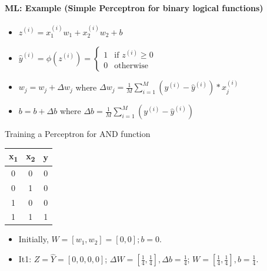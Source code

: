 \documentclass[xcolor=table]{beamer}
\subtitle[ML for NLP]{Chapter 02\\Machine learning for NLP}
\begin{document}
	

\begin{frame}
	\frametitle{\inserttitle}
	\framesubtitle{ML: Example (Simple Perceptron for binary logical functions)}
	
	\begin{minipage}{0.30\textwidth} 
	\end{minipage}
	\begin{minipage}{0.59\textwidth}
		\scriptsize
		\begin{itemize}
			\item $ z^{(i)} = x_1^{(i)} w_1 + x_2^{(i)} w_2 + b $
			\item $ \hat{y}^{(i)} = \phi(z^{(i)}) = \begin{cases}
				1 & \text{if } z^{(i)} \ge 0 \\
				0 & \text{otherwise}
			\end{cases} $
			\item $ w_j = w_j + \Delta w_j$ where $ \Delta w_j = \frac{1}{M}\sum_{i=1}^{M} (y^{(i)} - \hat{y}^{(i)}) * x_j^{(i)} $
			\item $ b = b + \Delta b$ where $ \Delta b = \frac{1}{M}\sum_{i=1}^{M} (y^{(i)} - \hat{y}^{(i)})$
		\end{itemize}
	\end{minipage}
	
	\vfill
	
	\begin{exampleblock}{Training a Perceptron for AND function}
		\begin{minipage}{0.2\textwidth} 
			\scriptsize
			\begin{tabular}{|c|c|c|}
				\hline
				x\textsubscript{1} & x\textsubscript{2} & y \\
				\hline
				0 & 0 & 0  \\
				\hline
				0 & 1 & 0 \\
				\hline
				1 & 0 & 0 \\
				\hline
				1 & 1 & 1 \\
				\hline
			\end{tabular}
		\end{minipage}
		\begin{minipage}{0.79\textwidth}
			\scriptsize
			\begin{itemize}
				\item Initially, $ W = [w_1, w_2] = [0, 0]; b = 0 $.
				
				\item It1: $ Z = \hat{Y} = [0, 0, 0, 0] $;
				$ \Delta W = [\frac{1}{4}, \frac{1}{4}], \Delta b = \frac{1}{4} $;
				$ W = [\frac{1}{4}, \frac{1}{4}], b = \frac{1}{4}$.
				

\end{itemize}
\end{minipage}
\end{exampleblock}
\end{frame}
\end{document}
